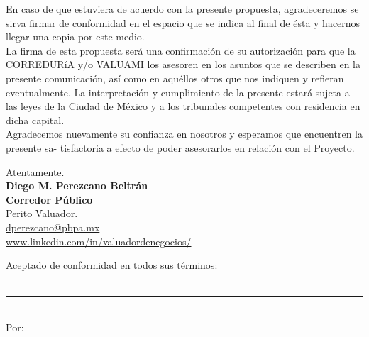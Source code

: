 \begin{enumerate}[I.]
En caso de que estuviera de acuerdo con la presente propuesta, agradeceremos se sirva firmar de  conformidad en el espacio que se indica al final de \'esta y hacernos llegar una copia por este medio.\\

La firma de esta propuesta ser\'a una confirmaci\'on de su autorizaci\'on para que la CORREDUR\'iA  y/o VALUAMI los asesoren en los asuntos que se describen en la presente comunicaci\'on, as\'i  como en aqu\'ellos otros que nos indiquen y refieran eventualmente. La interpretaci\'on y cumplimiento de la presente estar\'a sujeta a las leyes de la Ciudad de M\'exico y a los tribunales competentes con residencia en dicha capital.\\

Agradecemos nuevamente su confianza en nosotros y esperamos que encuentren la presente sa- tisfactoria a efecto de poder asesorarlos en relaci\'on con el Proyecto.\\
\end{enumerate}


\begin{flushleft}

Atentamente.\\[10pt]

\textbf{Diego M. Perezcano Beltr\'an}\\
\textbf{Corredor P\'ublico}\\
Perito Valuador.\\
\url{dperezcano@pbpa.mx}\\
\url{www.linkedin.com/in/valuadordenegocios/}\\
\vspace{1cm}
\end{flushleft}

\begin{flushright}

\begin{minipage}{7cm}


\begin{center}
Aceptado de conformidad en todos sus t\'erminos:\\
\nombreEmpresa\\[2cm]

\rule{7cm}{.4pt}\\
Por: \nombreInteresado
\end{center}

\end{minipage}
\end{flushright}